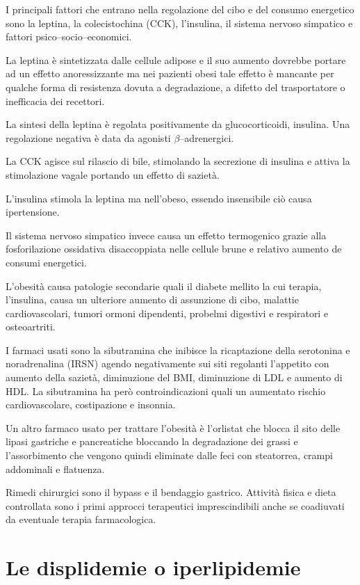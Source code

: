 I principali fattori che entrano nella regolazione del cibo e del consumo energetico sono la leptina, la colecistochina (CCK), l'insulina, il sistema nervoso simpatico e fattori psico--socio--economici.

La leptina è sintetizzata dalle cellule adipose e il suo aumento dovrebbe portare ad un effetto anoressizzante ma nei pazienti obesi tale effetto è mancante per qualche forma di resistenza dovuta a degradazione, a difetto del trasportatore o inefficacia dei recettori.

La sintesi della leptina è regolata positivamente da glucocorticoidi, insulina. Una regolazione negativa è data da agonisti $\beta$--adrenergici.

La CCK agisce sul rilascio di bile, stimolando la secrezione di insulina e attiva la stimolazione vagale portando un effetto di sazietà.

L'insulina stimola la leptina ma nell'obeso, essendo insensibile ciò causa ipertensione.

Il sistema nervoso simpatico invece causa un effetto termogenico grazie alla fosforilazione ossidativa disaccoppiata nelle cellule brune e relativo aumento de consumi energetici.

L'obesità causa patologie secondarie quali il diabete mellito la cui terapia, l'insulina, causa un ulteriore aumento di assunzione di cibo, malattie cardiovascolari, tumori ormoni dipendenti, probelmi digestivi e respiratori e osteoartriti.

I farmaci usati sono la sibutramina che inibisce la ricaptazione della serotonina e noradrenalina (IRSN) agendo negativamente sui siti regolanti l'appetito con aumento della sazietà, diminuzione del BMI, diminuzione di LDL e aumento di HDL. La sibutramina ha però controindicazioni quali un aumentato rischio cardiovascolare, costipazione e insonnia.

Un altro farmaco usato per trattare l'obesità è l'orlistat che blocca il sito delle lipasi gastriche e pancreatiche bloccando la degradazione dei grassi e l'assorbimento che vengono quindi eliminate dalle feci con steatorrea, crampi addominali e flatuenza.

Rimedi chirurgici sono il bypass e il bendaggio gastrico. Attività fisica e dieta controllata sono i primi approcci terapeutici imprescindibili anche se coadiuvati da eventuale terapia farmacologica.

\section{Le displidemie o iperlipidemie}

